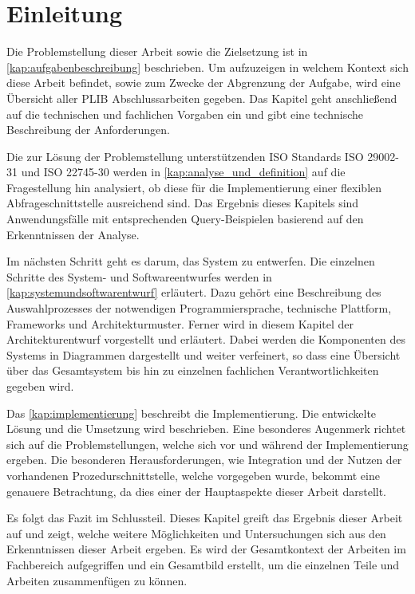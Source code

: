 
\chapter{Einleitung}\label{sec:einleitung}

Die Problemstellung dieser Arbeit sowie die Zielsetzung ist in \autoref{kap:aufgabenbeschreibung} beschrieben. Um aufzuzeigen in welchem Kontext sich diese Arbeit befindet, sowie zum Zwecke der Abgrenzung der Aufgabe, wird eine Übersicht aller PLIB Abschlussarbeiten gegeben. Das Kapitel geht anschließend auf die technischen und fachlichen Vorgaben ein und gibt eine technische Beschreibung der Anforderungen.

Die zur Lösung der Problemstellung unterstützenden ISO Standards ISO 29002-31 und ISO 22745-30 werden in \autoref{kap:analyse_und_definition} auf die Fragestellung hin analysiert, ob diese für die Implementierung einer flexiblen \gls{Abfrageschnittstelle} ausreichend sind. Das Ergebnis dieses Kapitels sind Anwendungsfälle mit entsprechenden Query-Beispielen basierend auf den Erkenntnissen der Analyse.  

Im nächsten Schritt geht es darum, das System zu entwerfen. Die einzelnen Schritte des System- und Softwareentwurfes werden in \autoref{kap:systemundsoftwarentwurf} erläutert. Dazu gehört eine Beschreibung des Auswahlprozesses der notwendigen Programmiersprache, technische Plattform, Frameworks und Architekturmuster. 
Ferner wird in diesem Kapitel der Architekturentwurf vorgestellt und erläutert. Dabei werden die Komponenten des Systems in Diagrammen dargestellt und weiter verfeinert, so dass eine Übersicht über das Gesamtsystem bis hin zu einzelnen fachlichen Verantwortlichkeiten gegeben wird. 

Das \autoref{kap:implementierung} beschreibt die Implementierung. Die entwickelte Lösung und die Umsetzung wird beschrieben. Eine besonderes Augenmerk richtet sich auf die Problemstellungen, welche sich vor und während der Implementierung ergeben. Die besonderen Herausforderungen, wie Integration und der Nutzen der vorhandenen Prozedurschnittstelle, welche vorgegeben wurde, bekommt eine genauere Betrachtung, da dies einer der Hauptaspekte dieser Arbeit darstellt.

Es folgt das Fazit im Schlussteil. Dieses Kapitel greift das Ergebnis dieser Arbeit auf und zeigt, welche weitere Möglichkeiten und Untersuchungen sich aus den Erkenntnissen dieser Arbeit ergeben. Es wird der Gesamtkontext der Arbeiten im Fachbereich aufgegriffen und ein Gesamtbild erstellt, um die einzelnen Teile und Arbeiten zusammenfügen zu können. 